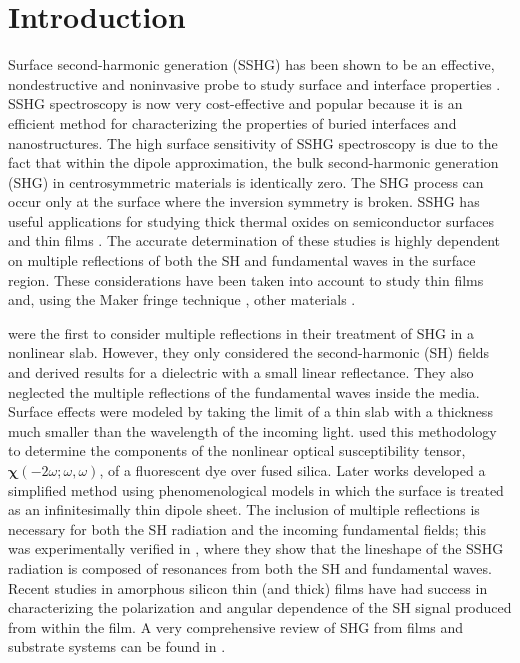 \documentclass[utf8]{frontiersSCNS}
\begin{document}
\section{Introduction}\label{sec:intro}

Surface second-harmonic generation (SSHG) has been shown to be an effective,
nondestructive and noninvasive probe to study surface and interface properties
\citep{chenPRL81, shenNAT89, mcgilpOE94, bloembergenAPB99, mcgilpSRL99,
lupkeSSR99, downerPSSA01, downerSIA01}. SSHG spectroscopy is now very
cost-effective and popular because it is an efficient method for characterizing
the properties of buried interfaces and nanostructures. The high surface
sensitivity of SSHG spectroscopy is due to the fact that within the dipole
approximation, the bulk second-harmonic generation (SHG) in centrosymmetric
materials is identically zero. The SHG process can occur only at the surface
where the inversion symmetry is broken. SSHG has useful applications for
studying thick thermal oxides on semiconductor surfaces
\citep{vanhasseltJOSAB95, kolthammerPRB05} and thin films \citep{yeganehPRB92}.
The accurate determination of these studies is highly dependent on multiple
reflections of both the SH and fundamental waves in the surface region. These
considerations have been taken into account to study thin films
\citep{haseAPL92, buinitskayaMJPS02, buinitskayaCAS03} and, using the Maker
fringe technique \citep{makerPRL62}, other materials \citep{tellierOC07,
abeJOSAB08}.

\cite{bloembergenPR62} were the first to consider multiple reflections in their
treatment of SHG in a nonlinear slab. However, they only considered the
second-harmonic (SH) fields and derived results for a dielectric with a small
linear reflectance. They also neglected the multiple reflections of the
fundamental waves inside the media. Surface effects were modeled by taking the
limit of a thin slab with a thickness much smaller than the wavelength of the
incoming light. \cite{dickAPB85} used this methodology to determine the
components of the nonlinear optical susceptibility tensor,
$\boldsymbol{\chi}(-2\omega;\omega,\omega)$, of a fluorescent dye over fused
silica. Later works \citep{sipePRB87, mizrahiJOSA88} developed a simplified
method using phenomenological models in which the surface is treated as an
infinitesimally thin dipole sheet. The inclusion of multiple reflections is
necessary for both the SH radiation and the incoming fundamental fields; this
was experimentally verified in \cite{moritaJJAP88}, where they show that
the lineshape of the SSHG radiation is composed of resonances from both the SH
and fundamental waves.
{\color{red}
Recent studies in amorphous silicon thin (and thick) films \citep{kesselsAPL04,
aartsPRB06, lettieriAPL07} have had success in characterizing the polarization
and angular dependence of the SH signal produced from within the film. A very
comprehensive review of SHG from films and substrate systems can be found in
\cite{gielisJVSTA08}.
}
\end{document}
